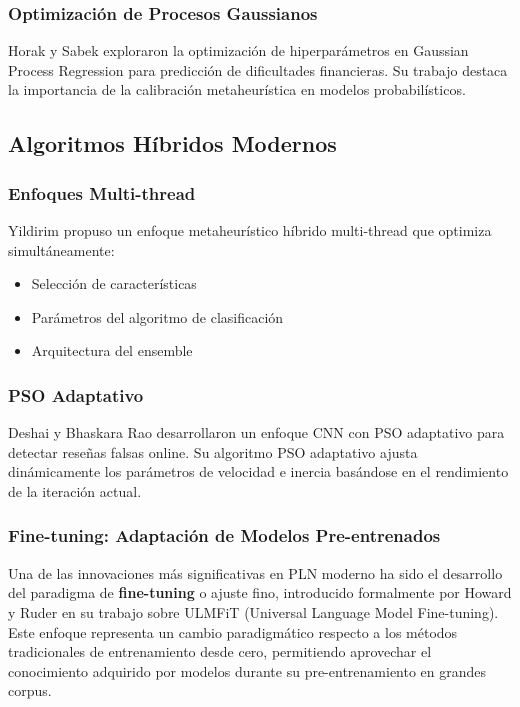 \subsubsection{Optimización de Procesos Gaussianos}

Horak y Sabek \cite{horak2023gaussian} exploraron la optimización de hiperparámetros en Gaussian Process Regression para predicción de dificultades financieras. Su trabajo destaca la importancia de la calibración metaheurística en modelos probabilísticos.

\subsection{Algoritmos Híbridos Modernos}

\subsubsection{Enfoques Multi-thread}

Yildirim \cite{yildirim2023novel} propuso un enfoque metaheurístico híbrido multi-thread que optimiza simultáneamente:
\begin{itemize}
    \item Selección de características
    \item Parámetros del algoritmo de clasificación
    \item Arquitectura del ensemble
\end{itemize}

\subsubsection{PSO Adaptativo}

Deshai y Bhaskara Rao \cite{deshai2023unmasking} desarrollaron un enfoque CNN con PSO adaptativo para detectar reseñas falsas online. Su algoritmo PSO adaptativo ajusta dinámicamente los parámetros de velocidad e inercia basándose en el rendimiento de la iteración actual.

\subsubsection{Fine-tuning: Adaptación de Modelos Pre-entrenados}

Una de las innovaciones más significativas en PLN moderno ha sido el desarrollo del paradigma de \textbf{fine-tuning} o ajuste fino, introducido formalmente por Howard y Ruder \cite{howard2018universal} en su trabajo sobre ULMFiT (Universal Language Model Fine-tuning). Este enfoque representa un cambio paradigmático respecto a los métodos tradicionales de entrenamiento desde cero, permitiendo aprovechar el conocimiento adquirido por modelos durante su pre-entrenamiento en grandes corpus.

